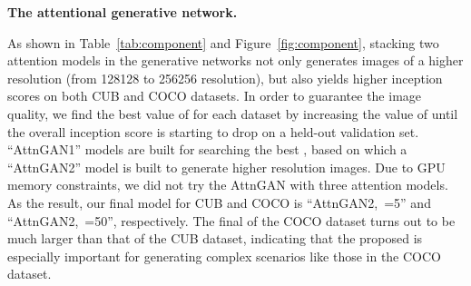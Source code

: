 \documentclass[10pt,twocolumn,letterpaper]{article}
\begin{document}
\textbf{The attentional generative network. }{
As shown in Table~\ref{tab:component} and Figure~\ref{fig:component}, stacking two attention models in the generative networks not only generates images of a higher resolution (from 128128 to 256256 resolution), but also yields higher inception scores on both CUB and COCO datasets. In order to guarantee the image quality, we find the best value of  for each dataset by increasing the value of  until the overall inception score is starting to drop on a held-out validation set. ``AttnGAN1'' models are built for searching the best , based on which a ``AttnGAN2'' model is built to generate higher resolution images. Due to GPU memory constraints, we did not try the AttnGAN with three attention models. As the result, our final model for CUB and COCO is ``AttnGAN2,~=5'' and ``AttnGAN2,~=50'', respectively. The final  of the COCO dataset turns out to be much larger than that of the CUB dataset, indicating that the proposed  is especially important for generating complex scenarios like those in the COCO dataset. 




}
\end{document}
